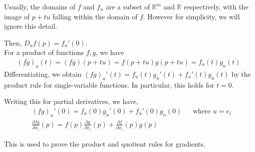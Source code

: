 \documentclass{article}
\begin{document}
Usually, the domains of $f$ and $f_u$ are a subset of $\mathbb{R}^m$ and $\mathbb{R}$ respectively, with the image of $p+tu$ falling within the domain of $f$. However for simplicity, we will ignore this detail.

Then, $D_uf(p)=f_u'(0)$.\\
For a product of functions $f,g$, we have 
\begin{align*}
	(fg)_u(t)=(fg)(p+tu)=f(p+tu)g(p+tu)=f_u(t)g_u(t)
\end{align*}
Differentiating, we obtain $(fg)_u'(t)=f_u(t)g_u'(t)+f_u'(t)g_u(t)$ by the product rule for single-variable functions. In particular, this holds for $t=0$.

Writing this for partial derivatives, we have,
\begin{align*}
	&(fg)_u'(0)=f_u(0)g_u'(0)+f_u'(0)g_u(0) &&\text{where $u=e_i$}\\
	&\frac{\partial fg}{\partial x_i}(p)=f(p)\frac{\partial g}{\partial x_i}(p)+\frac{\partial f}{\partial x_i}(p)g(p)
\end{align*}

This is used to prove the product and quotient rules for gradients.
\end{document}
